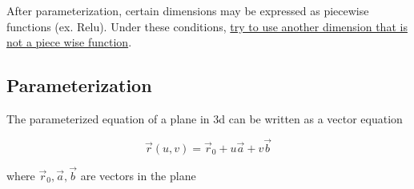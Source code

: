     After parameterization, certain dimensions may be expressed
    as piecewise functions (ex. Relu). Under these conditions, \ul{try
    to use another dimension that is not a piece wise function}.

  \subsection{Parameterization}

    The parameterized equation of a plane in 3d can be written as a
    vector equation

    \begin{equation}
      \vec{r}\left( u, v \right) = \vec{r}_{0} + u\vec{a} + v\vec{b}
    \end{equation}

    where $ \vec{r}_{0}, \vec{a}, \vec{b} $ are vectors in the plane